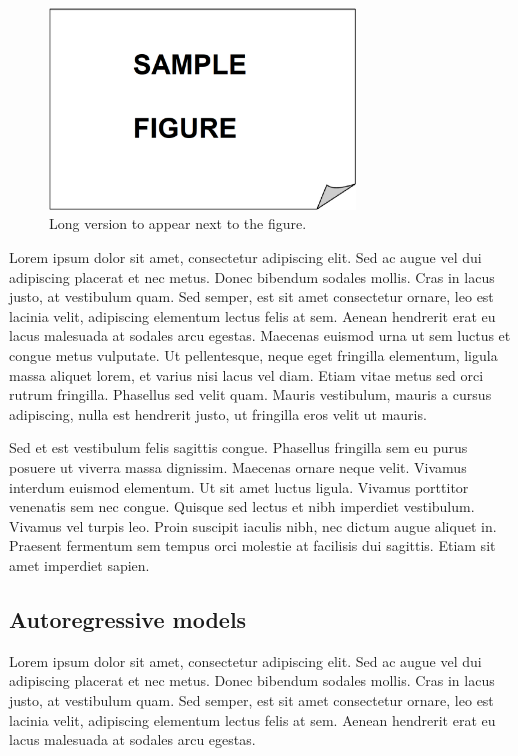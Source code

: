 \begin{figure}
 \centering
 \includegraphics[width=230pt,keepaspectratio=true]{./fig/sekil3}
 \vspace*{4mm}
 \caption[Short version for LoF]{Long version to appear next to the figure.}
 \label{fig:3-1-1}
\end{figure}

Lorem ipsum dolor sit amet, consectetur adipiscing elit. Sed ac augue vel dui 
adipiscing placerat et nec metus. Donec bibendum sodales mollis. Cras in lacus 
justo, at vestibulum quam. Sed semper, est sit amet consectetur ornare, leo est 
lacinia velit, adipiscing elementum lectus felis at sem. Aenean hendrerit erat eu 
lacus malesuada at sodales arcu egestas. Maecenas euismod urna ut sem luctus et 
congue metus vulputate. Ut pellentesque, neque eget fringilla elementum, ligula 
massa aliquet lorem, et varius nisi lacus vel diam. Etiam vitae metus sed orci 
rutrum fringilla. Phasellus sed velit quam. Mauris vestibulum, mauris a cursus 
adipiscing, nulla est hendrerit justo, ut fringilla eros velit ut mauris.

Sed et est vestibulum felis sagittis congue. Phasellus fringilla sem eu purus 
posuere ut viverra massa dignissim. Maecenas ornare neque velit. Vivamus interdum 
euismod elementum. Ut sit amet luctus ligula. Vivamus porttitor venenatis sem nec 
congue. Quisque sed lectus et nibh imperdiet vestibulum. Vivamus vel turpis leo. 
Proin suscipit iaculis nibh, nec dictum augue aliquet in. Praesent fermentum sem 
tempus orci molestie at facilisis dui sagittis. Etiam sit amet imperdiet sapien.

\subsection{Autoregressive models}

Lorem ipsum dolor sit amet, consectetur adipiscing elit. Sed ac augue vel dui 
adipiscing placerat et nec metus. Donec bibendum sodales mollis. Cras in lacus 
justo, at vestibulum quam. Sed semper, est sit amet consectetur ornare, leo est 
lacinia velit, adipiscing elementum lectus felis at sem. Aenean hendrerit erat eu 
lacus malesuada at sodales arcu egestas. 

